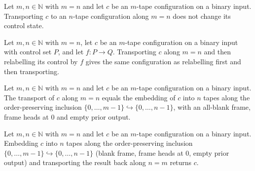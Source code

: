 \begin{theorem}
\label{Complexity.f6_cast_cfg_state}
\leanok
{}
Let $m,n\in\mathbb{N}$ with $m=n$ and let $c$ be an $m$-tape configuration on a binary input.
Transporting $c$ to an $n$-tape configuration along $m=n$ does not change its control state.
\end{theorem}

\begin{theorem}
\label{Complexity.f6_cast_cfg_mapState}
\leanok
{}
Let $m,n\in\mathbb{N}$ with $m=n$, let $c$ be an $m$-tape configuration on a binary input with
control set $P$, and let $f:P\to Q$. Transporting $c$ along $m=n$ and then relabelling its control
by $f$ gives the same configuration as relabelling first and then transporting.
\end{theorem}

\begin{theorem}
\label{Complexity.f6_cast_cfg_embedding}
\leanok
{}
Let $m,n\in\mathbb{N}$ with $m=n$ and let $c$ be an $m$-tape configuration on a binary input.
The transport of $c$ along $m=n$ equals the embedding of $c$ into $n$ tapes along the
order-preserving inclusion $\{0,\dots,m-1\}\hookrightarrow\{0,\dots,n-1\}$, with an all-blank
frame, frame heads at $0$ and empty prior output.
\end{theorem}

\begin{theorem}
\label{Complexity.f6_cast_back_embedding}
\leanok
{}
Let $m,n\in\mathbb{N}$ with $m=n$ and let $c$ be an $m$-tape configuration on a binary input.
Embedding $c$ into $n$ tapes along the order-preserving inclusion
$\{0,\dots,m-1\}\hookrightarrow\{0,\dots,n-1\}$ (blank frame, frame heads at $0$, empty prior output)
and transporting the result back along $n=m$ returns $c$.
\end{theorem}

